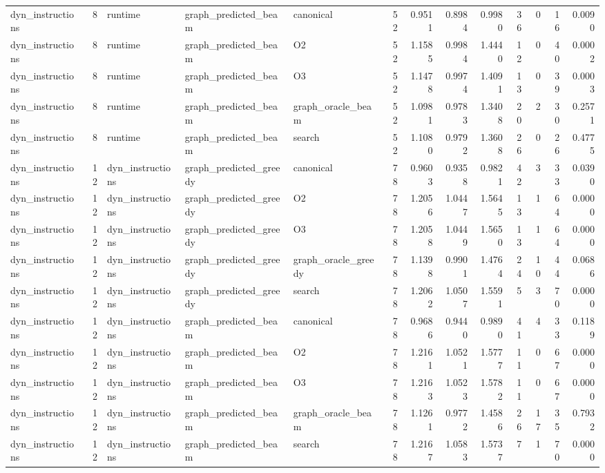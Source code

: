 \begin{table}[t]
\begin{tabular}{lrlllrrrrrrrr}
dyn\_instructions & 8 & runtime & graph\_predicted\_beam & canonical & 52 & 0.9511 & 0.8984 & 0.9980 & 36 & 0 & 16 & 0.0090 \\
dyn\_instructions & 8 & runtime & graph\_predicted\_beam & O2 & 52 & 1.1585 & 0.9984 & 1.4440 & 12 & 0 & 40 & 0.0002 \\
dyn\_instructions & 8 & runtime & graph\_predicted\_beam & O3 & 52 & 1.1478 & 0.9974 & 1.4091 & 13 & 0 & 39 & 0.0003 \\
dyn\_instructions & 8 & runtime & graph\_predicted\_beam & graph\_oracle\_beam & 52 & 1.0981 & 0.9783 & 1.3408 & 20 & 2 & 30 & 0.2571 \\
dyn\_instructions & 8 & runtime & graph\_predicted\_beam & search & 52 & 1.1080 & 0.9792 & 1.3608 & 26 & 0 & 26 & 0.4775 \\
dyn\_instructions & 12 & dyn\_instructions & graph\_predicted\_greedy & canonical & 78 & 0.9603 & 0.9358 & 0.9821 & 42 & 3 & 33 & 0.0390 \\
dyn\_instructions & 12 & dyn\_instructions & graph\_predicted\_greedy & O2 & 78 & 1.2056 & 1.0447 & 1.5645 & 13 & 1 & 64 & 0.0000 \\
dyn\_instructions & 12 & dyn\_instructions & graph\_predicted\_greedy & O3 & 78 & 1.2058 & 1.0449 & 1.5650 & 13 & 1 & 64 & 0.0000 \\
dyn\_instructions & 12 & dyn\_instructions & graph\_predicted\_greedy & graph\_oracle\_greedy & 78 & 1.1398 & 0.9901 & 1.4764 & 24 & 10 & 44 & 0.0686 \\
dyn\_instructions & 12 & dyn\_instructions & graph\_predicted\_greedy & search & 78 & 1.2062 & 1.0507 & 1.5591 & 5 & 3 & 70 & 0.0000 \\
dyn\_instructions & 12 & dyn\_instructions & graph\_predicted\_beam & canonical & 78 & 0.9686 & 0.9440 & 0.9890 & 41 & 4 & 33 & 0.1189 \\
dyn\_instructions & 12 & dyn\_instructions & graph\_predicted\_beam & O2 & 78 & 1.2161 & 1.0521 & 1.5777 & 11 & 0 & 67 & 0.0000 \\
dyn\_instructions & 12 & dyn\_instructions & graph\_predicted\_beam & O3 & 78 & 1.2163 & 1.0523 & 1.5782 & 11 & 0 & 67 & 0.0000 \\
dyn\_instructions & 12 & dyn\_instructions & graph\_predicted\_beam & graph\_oracle\_beam & 78 & 1.1261 & 0.9772 & 1.4586 & 26 & 17 & 35 & 0.7932 \\
dyn\_instructions & 12 & dyn\_instructions & graph\_predicted\_beam & search & 78 & 1.2167 & 1.0583 & 1.5737 & 7 & 1 & 70 & 0.0000 \\

\end{tabular}
\end{table}
